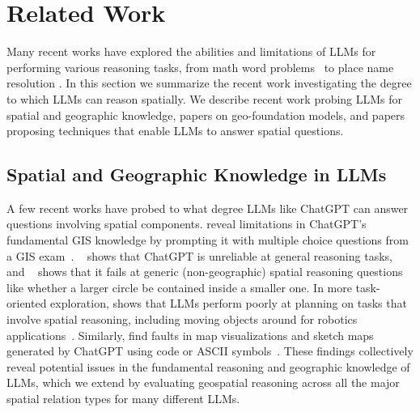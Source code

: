 \section{Related Work}
\label{section:related}
\normalsize

Many recent works have explored the abilities and limitations of LLMs for performing various reasoning tasks, from math word problems~\cite{Gao2023, Badaro2023} to place name resolution \cite{Mai2024}.
In this section we summarize the recent work investigating the degree to which LLMs can reason spatially.
We describe recent work probing LLMs for spatial and geographic knowledge, papers on geo-foundation models, and papers proposing techniques that enable LLMs to answer spatial questions.

\subsection{Spatial and Geographic Knowledge in LLMs}
A few recent works have probed to what degree LLMs like ChatGPT can answer questions involving spatial components.
\citeauthor{Mooney2023} reveal limitations in ChatGPT's fundamental GIS knowledge by prompting it with multiple choice questions from a GIS exam~\cite{Mooney2023}.
\citeauthor{Bang2023}~\cite{Bang2023} shows that ChatGPT is unreliable at general reasoning tasks, and
\citeauthor{Cohn2023}~\cite{Cohn2023} shows that it fails at generic (non-geographic) spatial reasoning questions like whether a larger circle be contained inside a smaller one.
In more task-oriented exploration, 
\citeauthor{Xie2023translating} shows that LLMs perform poorly at planning on tasks that involve spatial reasoning, including moving objects around for robotics applications~\cite{Xie2023translating}.
Similarly, 
\citeauthor{Tao2023} find faults in map visualizations and sketch maps generated by ChatGPT using code or ASCII symbols~\cite{Tao2023}.
These findings collectively reveal potential issues in the fundamental reasoning and geographic knowledge of LLMs, which we extend by evaluating geospatial reasoning across all the major spatial relation types for many different LLMs.

